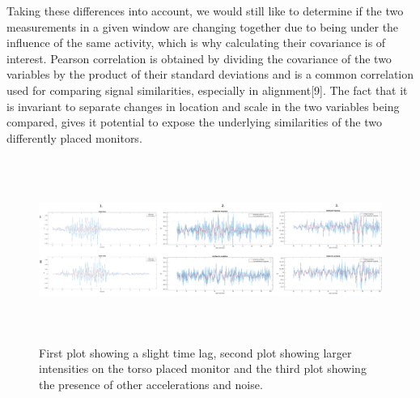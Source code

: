 \documentclass{article}
\begin{document}
{Taking these differences into account, we would still like to determine if the two measurements in a given window are changing together due to being under the influence of the same activity, which is why calculating their covariance is of interest. Pearson correlation is obtained by dividing the covariance of the two variables by the product of their standard deviations and is a common correlation used for comparing signal similarities, especially in alignment[9]. The fact that it is invariant to separate changes in location and scale in the two variables being compared, gives it potential to expose the underlying similarities of the two differently placed monitors.
\begin{figure}[h]
\includegraphics[width=15cm, height=6cm]{differences.png}
\caption{First plot showing a slight time lag, second plot showing larger intensities on the torso placed monitor and the third plot showing the presence of other accelerations and noise.}
\end{figure}\\
}
\end{document}
